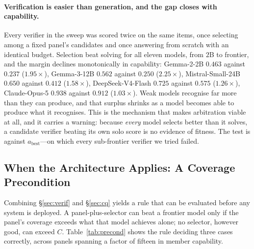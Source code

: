 \documentclass[manuscript,screen,review]{acmart}
\begin{document}
\paragraph{Verification is easier than generation, and the gap closes with
capability.} Every verifier in the sweep was scored twice on the same items, once
selecting among a fixed panel's candidates and once answering from scratch with an
identical budget. Selection beat solving for all eleven models, from $2$B to
frontier, and the margin declines monotonically in capability: Gemma-2-2B $0.463$
against $0.237$ ($1.95\times$), Gemma-3-12B $0.562$ against $0.250$ ($2.25\times$),
Mistral-Small-24B $0.650$ against $0.412$ ($1.58\times$), DeepSeek-V4-Flash $0.725$
against $0.575$ ($1.26\times$), Claude-Opus-5 $0.938$ against $0.912$
($1.03\times$). Weak models recognise far more than they can produce, and that
surplus shrinks as a model becomes able to produce what it recognises. This is the
mechanism that makes arbitration viable at all, and it carries a warning: because
\emph{every} model selects better than it solves, a candidate verifier beating its
own solo score is no evidence of fitness. The test is against
$a_{\mathrm{best}}$---on which every sub-frontier verifier we tried failed.

\subsection{When the Architecture Applies: A Coverage Precondition}
\label{sec:precond}
Combining \S\ref{sec:verif} and \S\ref{sec:cq} yields a rule
that can be evaluated before any system is deployed. A panel-plus-selector can
beat a frontier model only if the panel's coverage exceeds what that model
achieves alone; no selector, however good, can exceed $C$. Table~\ref{tab:precond}
shows the rule deciding three cases correctly, across panels spanning a factor of
fifteen in member capability.
\end{document}
